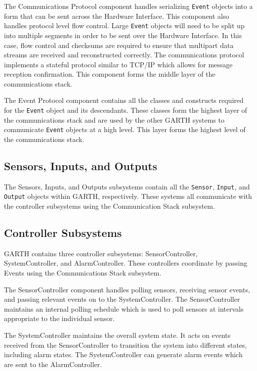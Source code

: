 \documentclass{report}
\begin{document}
The Communications Protocol component handles serializing \texttt{Event}
objects into a form that can be sent across the Hardware
Interface. This component also handles protocol level flow
control. Large \texttt{Event} objects will need to be split up into multiple
segments in order to be sent over the Hardware Interface. In this
case, flow control and checksums are required to ensure that multipart
data streams are received and reconstructed correctly. The
communications protocol implements a stateful protocol similar to
TCP/IP which allows for message reception confirmation. This component
forms the middle layer of the communications stack.

The Event Protocol component contains all the classes and constructs
required for the \texttt{Event} object and its descendants. These
classes form the highest layer of the communications stack and are
used by the other GARTH systems to communicate \texttt{Event} objects
at a high level. This layer forms the highest level of the
communications stack.

\subsection{Sensors, Inputs, and Outputs}

The Sensors, Inputs, and Outputs subsystems contain all the
\texttt{Sensor}, \texttt{Input}, and \texttt{Output} objects within
GARTH, respectively. These systems all communicate with the controller
subsystems using the Communication Stack subsystem.

\subsection{Controller Subsystems}

GARTH contains three controller subsystems: SensorController,
SystemController, and AlarmController. These controllers coordinate
by passing Events using the Communications Stack subsystem.

The SensorController component handles polling sensors, receiving
sensor events, and passing relevant events on to the
SystemController. The SensorController maintains an internal polling
schedule which is used to poll sensors at intervals appropriate to the
individual sensor.

The SystemController maintains the overall system state. It acts on
events received from the SensorController to transition the system
into different states, including alarm states. The SystemController
can generate alarm events which are sent to the AlarmController.
\end{document}
